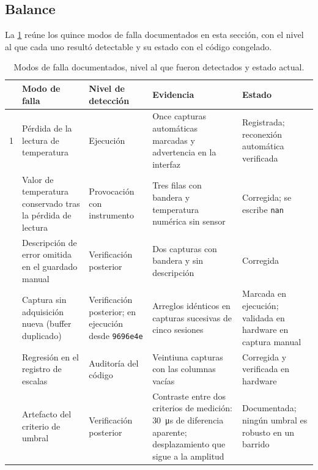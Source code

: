 \subsection{Balance}
\label{sec:fallas_balance}

La \cref{tab:resumen_fallas} reúne los quince modos de falla
documentados en esta sección, con el nivel al que cada uno resultó
detectable y su estado con el código congelado.

\begin{table}[H]
  \centering
  \caption{Modos de falla documentados, nivel al que fueron detectados y
           estado actual.}
  \label{tab:resumen_fallas}
  \footnotesize
  \begin{tabular}{p{0.4cm}>{\raggedright\arraybackslash}p{3.5cm}>{\raggedright\arraybackslash}p{2.5cm}>{\raggedright\arraybackslash}p{3.6cm}>{\raggedright\arraybackslash}p{3.3cm}}
    \toprule
    & \textbf{Modo de falla} & \textbf{Nivel de detección} &
    \textbf{Evidencia} & \textbf{Estado} \\
    \midrule
    1 & Pérdida de la lectura de temperatura & Ejecución &
    Once capturas automáticas marcadas y advertencia en la interfaz &
    Registrada; reconexión automática verificada \\
    \addlinespace[2pt]
    2 & Valor de temperatura conservado tras la pérdida de lectura &
    Provocación con instrumento &
    Tres filas con bandera y temperatura numérica sin sensor &
    Corregida; se escribe \texttt{nan} \\
    \addlinespace[2pt]
    3 & Descripción de error omitida en el guardado manual &
    Verificación posterior &
    Dos capturas con bandera y sin descripción & Corregida \\
    \addlinespace[2pt]
    4 & Captura sin adquisición nueva (buffer duplicado) &
    Verificación posterior; en ejecución desde \texttt{9696e4e} &
    Arreglos idénticos en capturas sucesivas de cinco sesiones &
    Marcada en ejecución; validada en hardware en captura manual \\
    \addlinespace[2pt]
    5 & Regresión en el registro de escalas & Auditoría del código &
    Veintiuna capturas con las columnas vacías &
    Corregida y verificada en hardware \\
    \addlinespace[2pt]
    6 & Artefacto del criterio de umbral & Verificación posterior &
    Contraste entre dos criterios de medición: \SI{30}{\micro\second} de diferencia aparente; desplazamiento que sigue a la amplitud &
    Documentada; ningún umbral es robusto en un barrido \\

\end{tabular}
\end{table}
